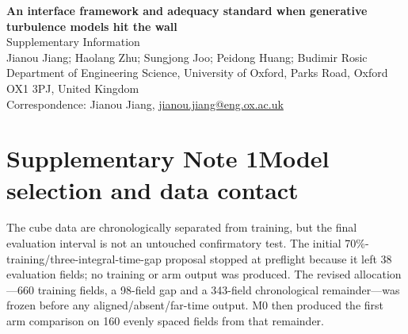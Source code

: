 \documentclass[11pt]{article}
\begin{document}
\begin{center}
{\Large\bfseries An interface framework and adequacy standard when generative turbulence models hit the wall}\\[5pt]
{\large Supplementary Information}\\[8pt]
Jianou Jiang; Haolang Zhu; Sungjong Joo; Peidong Huang; Budimir Rosic\\[3pt]
Department of Engineering Science, University of Oxford, Parks Road, Oxford OX1 3PJ,
United Kingdom\\[3pt]
Correspondence: Jianou Jiang, \href{mailto:jianou.jiang@eng.ox.ac.uk}
{jianou.jiang@eng.ox.ac.uk}
\end{center}

\section*{Supplementary Note 1\quad Model selection and data contact}\label{sec:s-contact}

The cube data are chronologically separated from training, but the final evaluation interval is not
an untouched confirmatory test. The initial 70\%-training/three-integral-time-gap proposal stopped
at preflight because it left 38 evaluation fields; no training or arm output was produced. The
revised allocation---660 training fields, a 98-field gap and a 343-field chronological
remainder---was frozen before any aligned/absent/far-time output. M0 then produced the first arm
comparison on 160 evenly spaced fields from that remainder.
\end{document}
